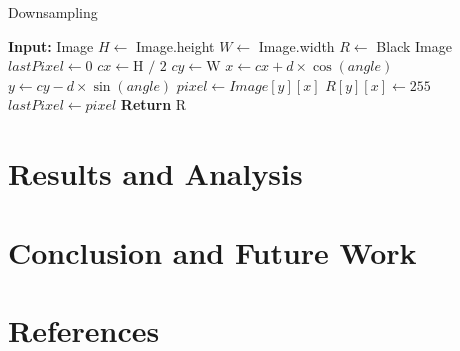 \documentclass[a4paper]{article}
\begin{document}
\begin{multicols}{2}
\begin{algorithm}[H]
\caption{Downsampling}
\begin{algorithmic}[1]
\Statex \textbf{Input: }Image
\State $H \gets$ Image.height
\State $W \gets$ Image.width
\State $R \gets$ Black Image
    \State $lastPixel \gets 0$
    \State $cx \gets \text{H / 2}$
    \State $cy \gets \text{W}$
        \State $x \gets cx + d \times \cos(angle)$
        \State $y \gets cy - d \times \sin(angle)$
          \State $pixel \gets Image[y][x]$
            \State $R[y][x] \gets 255 $ 
          \EndIf
          \State $lastPixel \gets pixel$
        \EndIf
    \EndFor
\EndFor
\State \textbf{Return} R
\end{algorithmic}
\end{algorithm}
\section{Results and Analysis}

\section{Conclusion and Future Work}

\section{References}

\end{multicols}
\end{document}
